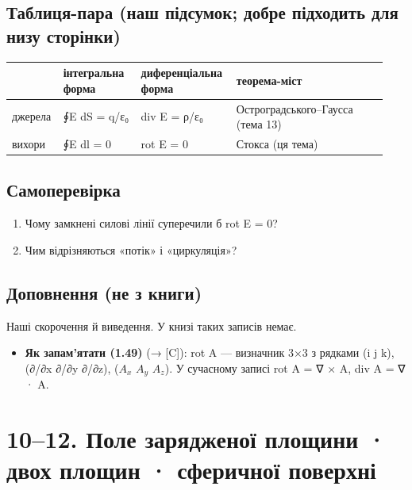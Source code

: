 \documentclass[11pt,a4paper,oneside]{book}
\begin{document}
\section*{Таблиця-пара (наш підсумок; добре підходить для низу сторінки)}
{\small
\begin{longtable}{>{\raggedright\arraybackslash}p{0.091\linewidth}>{\raggedright\arraybackslash}p{0.208\linewidth}>{\raggedright\arraybackslash}p{0.245\linewidth}>{\raggedright\arraybackslash}p{0.392\linewidth}}
\toprule
\textbf{} & \textbf{інтегральна форма} & \textbf{диференціальна форма} & \textbf{теорема-міст} \\
\midrule
\endhead
джерела & ∮E dS = q/ε₀ & div E = ρ/ε₀ & Остроградського–Гаусса (тема 13) \\
вихори & ∮E dl = 0 & rot E = 0 & Стокса (ця тема) \\
\bottomrule
\end{longtable}
}

\section*{Самоперевірка}
\begin{enumerate}
\item Чому замкнені силові лінії суперечили б rot E = 0?
\item Чим відрізняються «потік» і «циркуляція»?
\end{enumerate}

\section*{Доповнення (не з книги)}
Наші скорочення й виведення. У книзі таких записів немає.
\begin{itemize}
\item \textbf{Як запам'ятати (1.49)} (→ [C]): rot A — визначник 3×3 з рядками (i j k), (∂/∂x ∂/∂y ∂/∂z), ($A_{x}$ $A_{y}$ $A_{z}$). У сучасному записі rot A = ∇ × A, div A = ∇ · A.
\end{itemize}

\chapter*{10–12. Поле зарядженої площини · двох площин · сферичної поверхні}
\end{document}

